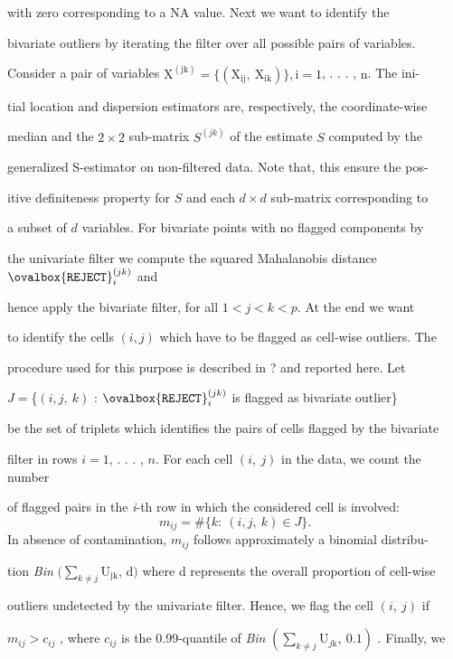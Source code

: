 \documentclass[a4paper,12pt]{article}
\begin{document}
with zero corresponding to a NA value. Next we want to identify the

bivariate outliers by iterating the filter over all possible pairs of variables.

Consider a pair of variables $\mathrm{X}^{(\mathrm{j}\mathrm{k})} = \{(\mathrm{X}_{\mathrm{i}\mathrm{j}},\ \mathrm{X}_{\mathrm{i}\mathrm{k}})\}, \mathrm{i} = 1$, . . . , $\mathrm{n}$. The ini-

tial location and dispersion estimators are, respectively, the coordinate-wise

median and the $2 \times 2$ sub-matrix $S^{(jk)}$ of the estimate $S$ computed by the

generalized S-estimator on non-filtered data. Note that, this ensure the pos-

itive definiteness property for $S$ and each $d\times d$ sub-matrix corresponding to

a subset of $d$ variables. For bivariate points with no flagged components by

the univariate filter we compute the squared Mahalanobis distance $\ovalbox{\tt\small REJECT}_{i}^{(jk)}$ and

hence apply the bivariate filter, for all $1 <j < k <p$. At the end we want

to identify the cells $(i,j)$ which have to be flagged as cell-wise outliers. The

procedure used for this purpose is described in ? and reported here. Let

$J=$\{$(i,j,\ k)$ : $\ovalbox{\tt\small REJECT}_{i}^{(jk)}$ is flagged as bivariate outlier\}

be the set of triplets which identifies the pairs of cells flagged by the bivariate

filter in rows $i=1$, . . . , $n$. For each cell $(i,\ j)$ in the data, we count the number

of flagged pairs in the {\it i}-th row in which the considered cell is involved:
$$
m_{ij}=\#\{k:\ (i,j,\ k)\in J\}.
$$
In absence of contamination, $m_{ij}$ follows approximately a binomial distribu-

tion {\it Bin} $(\displaystyle \sum_{k\neq j}\mathrm{U}_{\mathrm{j}\mathrm{k}}$, d$)$ where d represents the overall proportion of cell-wise

outliers undetected by the univariate filter. Hence, we flag the cell $(i,\ j)$ if

$m_{ij} > c_{ij}$ , where $c_{ij}$ is the 0.99-quantile of {\it Bin} $(\displaystyle \sum_{k\neq j}\mathrm{U}_{j\mathrm{k}},\ 0.1)$ . Finally, we
\end{document}
